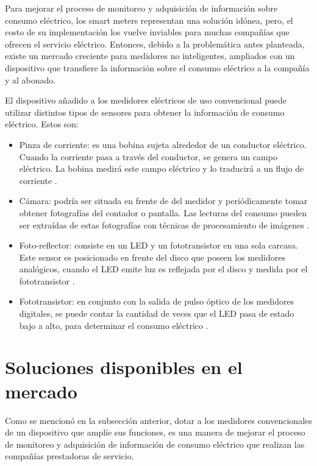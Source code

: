 
Para mejorar el proceso de monitoreo y adquisición de información sobre consumo eléctrico, los smart meters representan una solución idónea, pero, el costo de su implementación los vuelve inviables para muchas compañías que ofrecen el servicio eléctrico. Entonces, debido a la problemática antes planteada, existe un mercado creciente para medidores no inteligentes, ampliados con un dispositivo que transfiere la información sobre el consumo eléctrico a la compañía y al abonado.

El dispositivo añadido a los medidores eléctricos de uso convencional puede utilizar distintos tipos de sensores para obtener la información de consumo eléctrico. Estos son:

\begin{itemize}
	\item Pinza de corriente: es una bobina sujeta alrededor de un conductor eléctrico. Cuando la corriente pasa a través del conductor, se genera un campo eléctrico. La bobina medirá este campo eléctrico y lo traducirá  a un flujo de corriente \citep{WEBSITE:3}.
	\item Cámara: podría ser situada en frente de del medidor y periódicamente tomar obtener fotografías del contador o pantalla. Las lecturas del consumo pueden ser extraídas de estas fotografías con técnicas de procesamiento de imágenes \citep{ARTICLE:1}.
	\item Foto-reflector: consiste en un LED y un fototransistor en una sola carcasa. Este sensor es posicionado en frente del disco que poseen los medidores analógicos, cuando el LED emite luz es reflejada por el disco y medida por el fototransistor \citep{WEBSITE:4}.
	\item Fototransistor: en conjunto con la salida de pulso óptico de los medidores digitales, se puede contar la cantidad de veces que el LED pasa de estado bajo a alto, para determinar el consumo eléctrico \citep{WEBSITE:5}.
\end{itemize}


\section{Soluciones disponibles en el mercado}

Como se mencionó en la subsección anterior, dotar a los medidores convencionales de un dispositivo que amplíe sus funciones, es una manera de mejorar el proceso de monitoreo y adquisición de información de consumo eléctrico que realizan las compañías prestadoras de servicio.

